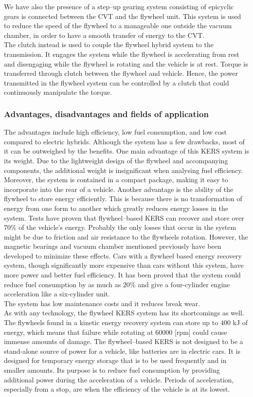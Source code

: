 \documentclass[11pt]{article}
\begin{document}
We have also the presence of a step--up gearing system consisting of epicyclic gears is connected between the CVT and the flywheel unit. This system is used to reduce the speed of the flywheel to a manageable one outside the vacuum chamber, in order to have a smooth transfer of energy to the CVT.\\
The clutch instead is used to couple the flywheel hybrid system to the transmission. It engages the system while the flywheel is accelerating from rest and disengaging while the flywheel is rotating and the vehicle is at rest. Torque is transferred through clutch between the flywheel and vehicle. Hence, the power transmitted in the flywheel system can be controlled by a clutch that could continuously manipulate the torque.

\subsubsection{Advantages, disadvantages and fields of application}

The advantages include high efficiency, low fuel consumption, and low cost compared to electric hybrids. Although the system has a few drawbacks, most of it can be outweighed by the benefits. One main advantage of this KERS system is its weight. Due to the lightweight design of the flywheel and accompanying components, the additional weight is insignificant when analysing fuel efficiency. Moreover, the system is contained in a compact package, making it easy to incorporate into the rear of a vehicle. Another advantage is the ability of the flywheel to store energy efficiently. This is because there is no transformation of energy from one form to another which greatly reduces energy losses in the system. Tests have proven that flywheel--based KERS can recover and store over $70\%$ of the vehicle’s energy. Probably the only losses that occur in the system might be due to friction and air resistance to the flywheels rotation. However, the magnetic bearings and vacuum chamber mentioned previously have been developed to minimize these effects. Cars with a flywheel based energy recovery system, though significantly more expensive than cars without this system, have more power and better fuel efficiency. It has been proved that the system could reduce fuel consumption by as much as $20$\% and give a four-cylinder engine acceleration like a six-cylinder unit.\\
The system has low maintenance costs and it reduces break wear.\\
As with any technology, the flywheel KERS system has its shortcomings as well. The flywheels found in a kinetic energy recovery system can store up to $400$ kJ of energy, which means that failure while rotating at $60000$ [rpm] could cause immense amounts of damage. The flywheel--based KERS is not designed to be a stand-alone source of power for a vehicle, like batteries are in electric cars. It is designed for temporary energy storage that is to be used frequently and in smaller amounts. Its purpose is to reduce fuel consumption by providing additional power during the acceleration of a vehicle. Periods of acceleration, especially from a stop, are when the efficiency of the vehicle is at its lowest.
\end{document}
